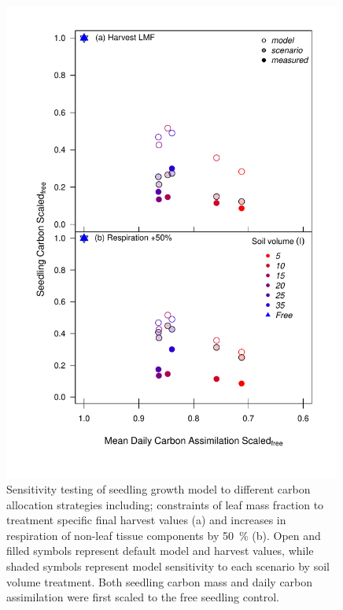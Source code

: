 \documentclass[a4paper]{article}\usepackage[]{graphicx}\usepackage[]{color}
\begin{document}
\begin{figure}[h!]
    \centering
    \includegraphics[width=0.99\textwidth]{massmodel_resp.pdf}
    \caption{Sensitivity testing of seedling growth model to different carbon allocation strategies including; constraints of leaf mass fraction to treatment specific final harvest values (a) and increases in respiration of non-leaf tissue components by 50~\% (b). Open and filled symbols represent default model and harvest values, while shaded symbols represent model sensitivity to each scenario by soil volume treatment. Both seedling carbon mass and daily carbon assimilation were first scaled to the free seedling control.}
    \label{fig:figure 2.S1}
\end{figure}

   
\clearpage
\end{document}
